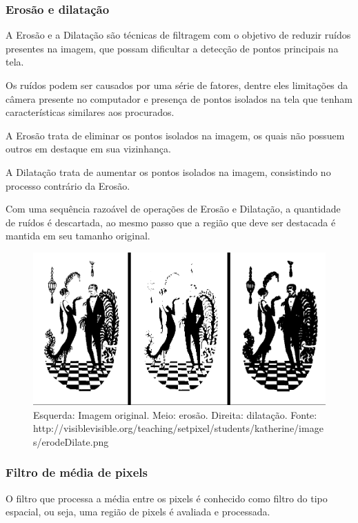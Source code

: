 \documentclass[12pt]{article}
\begin{document}
\subsubsection{Eros\~ao e dilata\c c\~ao}
A Eros\~ao e a Dilata\c c\~ao s\~ao t\'ecnicas de filtragem com o objetivo de reduzir ru\'idos presentes na imagem,
que possam dificultar a detec\c c\~ao de pontos principais na tela.

Os ru\'idos podem ser causados por uma s\'erie de fatores, dentre eles limita\c c\~oes da c\^amera presente no computador
e presen\c ca de pontos isolados na tela que tenham caracter\'isticas similares aos procurados.

A Eros\~ao trata de eliminar os pontos isolados na imagem, os quais n\~ao possuem outros em destaque em sua vizinhan\c ca.

A Dilata\c c\~ao trata de aumentar os pontos isolados na imagem, consistindo no processo contr\'ario da Eros\~ao.

Com uma sequ\^encia razo\'avel de opera\c c\~oes de Eros\~ao e Dilata\c c\~ao, a quantidade de ru\'idos \'e descartada,
ao mesmo passo que a regi\~ao que deve ser destacada \'e mantida em seu tamanho original.

	\begin{figure}[ht!]
	\begin{center}
		\includegraphics[scale=0.3]{img/erodeDilate.png}
		\footnotesize \caption{Esquerda: Imagem original. Meio: eros\~ao. Direita: dilata\c c\~ao. Fonte: http://visiblevisible.org/teaching/setpixel/students/katherine/images/erodeDilate.png }
	\end{center}
	\end{figure}	

\subsubsection{Filtro de m\'edia de pixels}
O filtro que processa a m\'edia entre os pixels \'e conhecido como filtro do tipo espacial,
ou seja, uma regi\~ao de pixels \'e avaliada e processada.
\end{document}
